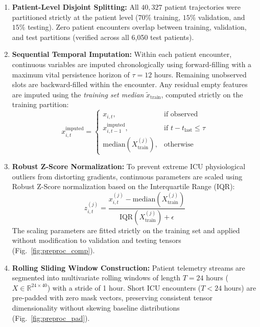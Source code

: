 \documentclass[journal,twocolumn,10pt]{IEEEtran}
\begin{document}
\begin{enumerate}
    \item \textbf{Patient-Level Disjoint Splitting:} All $40,327$ patient trajectories were partitioned strictly at the patient level ($70\%$ training, $15\%$ validation, and $15\%$ testing). Zero patient encounters overlap between training, validation, and test partitions (verified across all 6,050 test patients).
    \item \textbf{Sequential Temporal Imputation:} Within each patient encounter, continuous variables are imputed chronologically using forward-filling with a maximum vital persistence horizon of $\tau = 12$ hours. Remaining unobserved slots are backward-filled within the encounter. Any residual empty features are imputed using the \textit{training set median} $\tilde{x}_{\text{train}}$, computed strictly on the training partition:
    \begin{equation}
    x_{i, t}^{\text{imputed}} = \begin{cases}
    x_{i, t}, & \text{if observed} \\
    x_{i, t-1}^{\text{imputed}}, & \text{if } t - t_{\text{last}} \le \tau \\
    \text{median}(X_{\text{train}}^{(j)}), & \text{otherwise}
    \end{cases}
    \end{equation}
    \item \textbf{Robust Z-Score Normalization:} To prevent extreme ICU physiological outliers from distorting gradients, continuous parameters are scaled using Robust Z-Score normalization based on the Interquartile Range (IQR):
    \begin{equation}
    z_{i, t}^{(j)} = \frac{x_{i, t}^{(j)} - \text{median}(X_{\text{train}}^{(j)})}{\text{IQR}(X_{\text{train}}^{(j)}) + \epsilon}
    \end{equation}
    The scaling parameters are fitted strictly on the training set and applied without modification to validation and testing tensors (Fig.~\ref{fig:preproc_comp}).
    \item \textbf{Rolling Sliding Window Construction:} Patient telemetry streams are segmented into multivariate rolling windows of length $T = 24$ hours ($X \in \mathbb{R}^{24 \times 40}$) with a stride of 1 hour. Short ICU encounters ($T < 24$ hours) are pre-padded with zero mask vectors, preserving consistent tensor dimensionality without skewing baseline distributions (Fig.~\ref{fig:preproc_pad}).
\end{enumerate}
\end{document}
